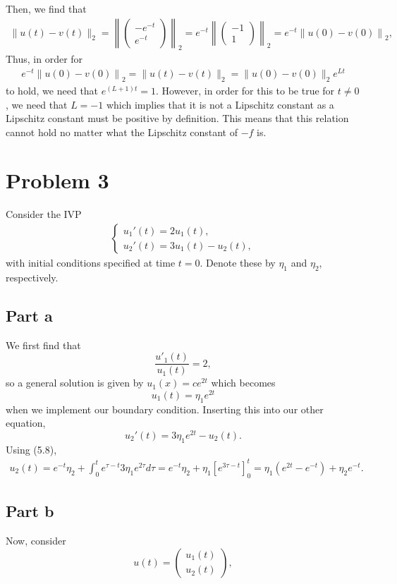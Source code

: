 \documentclass{article}
\begin{document}
Then, 
we find that
\begin{align*}
	\|u(t) - v(t)\|_2 =\left\|\begin{pmatrix}
		-e^{-t}\\e^{-t}
	\end{pmatrix}\right\|_2=e^{-t}\left\|\begin{pmatrix}
		-1\\1
	\end{pmatrix}\right\|_2=e^{-t}\left\|u(0)-v(0)\right\|_2,
\end{align*}
Thus, in order for 
\begin{align*}
	e^{-t}\left\|u(0)-v(0)\right\|_2=\|u(t) - v(t)\|_2 = \|u(0) - v(0)\|_2 e^{L t}
\end{align*}
to hold, we need that $e^{(L+1)t}=1$. However, in order for this to be true for $t\neq0$, we need that $L=-1$ which implies that it is not a Lipschitz constant as a Lipschitz constant must be positive by definition. This means that this relation cannot hold no matter what the Lipschitz constant of $-f$ is.

\section{Problem 3}
Consider the IVP
\begin{align*}
	\begin{cases}
		u_1'(t) = 2u_1(t),\\
		u_2'(t) = 3u_1(t) - u_2(t),
	\end{cases}
\end{align*}
with initial conditions specified at time $t=0$. Denote these by $\eta_1$ and $\eta_2$, respectively.  
\subsection{Part a}
We first find that
\[
\frac{u'_1(t)}{u_1(t)}=2,
\]
so a general solution is given by $u_1(x)=ce^{2t}$ which becomes 
\[
u_1(t)=\eta_1e^{2t}
\]
when we implement our boundary condition. Inserting this into our other equation,
\[
u_2'(t) = 3\eta_1e^{2t} - u_2(t).
\]
Using (5.8), 
\begin{align*}
u_2(t)=e^{-t}\eta_2+\int_0^te^{\tau-t}3\eta_1e^{2\tau}d\tau=e^{-t}\eta_2+\eta_1\left[e^{3\tau-t}\right]_0^t=\eta_1(e^{2t}-e^{-t})+\eta_2e^{-t}.
\end{align*}

\subsection{Part b}
Now, consider 
\[
u(t)=\begin{pmatrix}
	u_1(t)\\u_2(t)
\end{pmatrix},
\]
\end{document}
